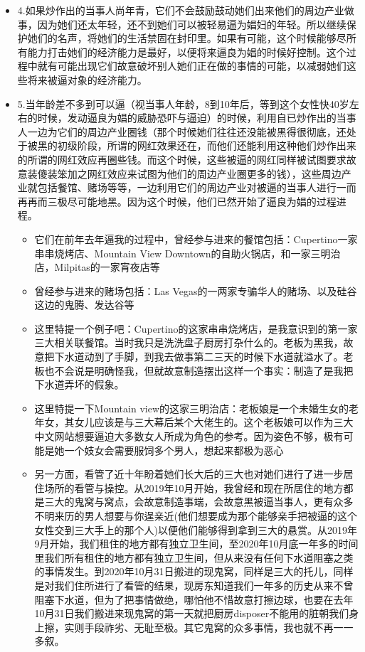 \documentclass[9pt, b5paper]{article}
\begin{document}
\begin{itemize}
\begin{itemize}
\end{itemize}
\item 4.如果炒作出的当事人尚年青，它们不会鼓励鼓动她们出来他们的周边产业做事，因为她们还太年轻，还不到她们可以被轻易逼为娼妇的年轻。所以继续保护她们的名声，将她们的生活禁固在封印里。如果有可能，这个时候能够尽所有能力打击她们的经济能力是最好，以便将来逼良为娼的时候好控制。这个过程中就有可能出现它们故意破坏别人她们正在做的事情的可能，以减弱她们这些将来被逼对象的经济能力。
\item 5.当年龄差不多到可以逼（视当事人年龄，8到10年后，等到这个女性快40岁左右的时候，发动逼良为娼的威胁恐吓与逼迫）的时候，利用自已炒作出的当事人一边为它们的周边产业圈钱（那个时候她们往往还没能被黑得很彻底，还处于被黑的初级阶段，所谓的网红效果还在，而他们还能利用这种他们炒作出来的所谓的网红效应再圈些钱。而这个时候，这些被逼的网红同样被试图要求故意装傻装笨加之网红效应来试图为他们的周边产业圈更多的钱），这些周边产业就包括餐馆、赌场等等，一边利用它们的周边产业对被逼的当事人进行一而再再而三极尽可能地黑。因为这个时候，他们已然开始了逼良为娼的过程进程。
\begin{itemize}
\item 它们在前年去年逼我的过程中，曾经参与进来的餐馆包括：Cupertino一家串串烧烤店、Mountain View Downtown的自助火锅店，和一家三明治店，Milpitas的一家宵夜店等
\item 曾经参与进来的赌场包括：Las Vegas的一两家专骗华人的赌场、以及硅谷这边的鬼腾、发达谷等
\item 这里特提一个例子吧：Cupertino的这家串串烧烤店，是我意识到的第一家三大相关联餐馆。当时我只是洗洗盘子厨房打杂什么的。老板为黑我，故意把下水道动到了手脚，到我去做事第二三天的时候下水道就溢水了。老板也不会说是明确怪我，但就故意制造摆出这样一个事实：制造了是我把下水道弄坏的假象。
\item 这里特提一下Mountain view的这家三明治店：老板娘是一个未婚生女的老年女，其女儿应该是与三大幕后某个大佬生的。这个老板娘可以作为三大中文网站想要逼迫大多数女人所成为角色的参考。因为姿色不够，极有可能是她一个妓女会需要服饲多个男人，想起来都极为恶心
\item 另一方面，看管了近十年盼着她们长大后的三大也对她们进行了进一步居住场所的看管与操控。从2019年10月开始，我曾经和现在所居住的地方都是三大的鬼窝与窝点，会故意制造事端，会故意黑被逼当事人，更有众多不明来历的男人想要与你逞亲近(他们想要成为那个能够亲手把被逼的这个女性交到三大手上的那个人)以便他们能够得到拿到三大的悬赏。从2019年9月开始，我们租住的地方都有独立卫生间，至2020年10月底一年多的时间里我们所有租住的地方都有独立卫生间，但从来没有任何下水道阻塞之类的事情发生。到2020年10月31日搬进的现鬼窝，同样是三大的托儿，同样是对我们住所进行了看管的结果，现房东知道我们一年多的历史从来不曾阻塞下水道，但为了把事情做绝，哪怕他不惜故意打擦边球，也要在去年10月31日我们搬进来现鬼窝的第一天就把厨房disposer不能用的脏朝我们身上擦，实则手段祚劣、无耻至极。其它鬼窝的众多事情，我也就不再一一多叙。

\end{itemize}
\end{itemize}
\end{document}
